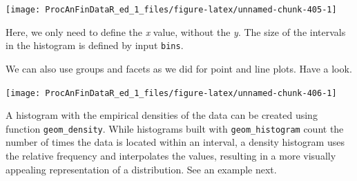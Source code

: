 \documentclass[11pt,]{book}
\newenvironment{Shaded}{\begin{snugshade}}{\end{snugshade}}
\newcommand{\KeywordTok}[1]{\textcolor[rgb]{0.27,0.27,0.27}{\textbf{#1}}}
\newcommand{\DataTypeTok}[1]{\textcolor[rgb]{0.27,0.27,0.27}{#1}}
\newcommand{\DecValTok}[1]{\textcolor[rgb]{0.06,0.06,0.06}{#1}}
\newcommand{\StringTok}[1]{\textcolor[rgb]{0.5,0.5,0.5}{#1}}
\newcommand{\CommentTok}[1]{\textcolor[rgb]{0.56,0.35,0.01}{\textit{#1}}}
\newcommand{\OperatorTok}[1]{\textcolor[rgb]{0.81,0.36,0.00}{\textbf{#1}}}
\newcommand{\NormalTok}[1]{#1}
\begin{document}
\begin{center}\texttt{[image: ProcAnFinDataR\_ed\_1\_files/figure-latex/unnamed-chunk-405-1]} \end{center}

Here, we only need to define the \emph{x} value, without the \emph{y}.
The size of the intervals in the histogram is defined by input
\texttt{bins}.

We can also use groups and facets as we did for point and line plots.
Have a look.

\begin{Shaded}
\end{Shaded}

\begin{center}\texttt{[image: ProcAnFinDataR\_ed\_1\_files/figure-latex/unnamed-chunk-406-1]} \end{center}

A histogram with the empirical densities of the data can be created
using function \texttt{geom\_density}. While histograms built with
\texttt{geom\_histogram} count the number of times the data is located
within an interval, a density histogram uses the relative frequency and
interpolates the values, resulting in a more visually appealing
representation of a distribution. See an example next.

\begin{Shaded}
\end{Shaded}
\end{document}

